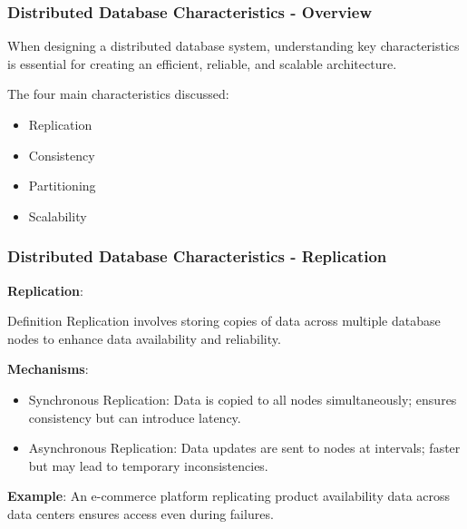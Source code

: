 \documentclass[aspectratio=169]{beamer}
\begin{document}
\begin{frame}[fragile]
  \frametitle{Distributed Database Characteristics - Overview}
  When designing a distributed database system, understanding key characteristics is essential for creating an efficient, reliable, and scalable architecture.
  
  The four main characteristics discussed:
  \begin{itemize}
    \item Replication
    \item Consistency
    \item Partitioning
    \item Scalability
  \end{itemize}
\end{frame}

\begin{frame}[fragile]
  \frametitle{Distributed Database Characteristics - Replication}
  \textbf{Replication}:
  \begin{block}{Definition}
    Replication involves storing copies of data across multiple database nodes to enhance data availability and reliability.
  \end{block}

  \textbf{Mechanisms}:
  \begin{itemize}
    \item Synchronous Replication: Data is copied to all nodes simultaneously; ensures consistency but can introduce latency.
    \item Asynchronous Replication: Data updates are sent to nodes at intervals; faster but may lead to temporary inconsistencies.
  \end{itemize}

  \textbf{Example}: 
  An e-commerce platform replicating product availability data across data centers ensures access even during failures.
\end{frame}
\end{document}
